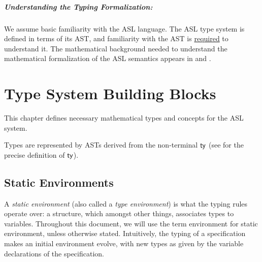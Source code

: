 \documentclass{book}
\begin{document}
\paragraph{Understanding the Typing Formalization:}
We assume basic familiarity with the ASL language.
The ASL type system is defined in terms of its AST,
and familiarity with the AST is \underline{required} to understand it.
The mathematical background needed to understand the mathematical formalization
of the ASL semantics appears in  and .



\chapter{Type System Building Blocks}
\label{chap:typesystembuildingblocks}
This chapter defines necessary mathematical types and concepts for the ASL system.

Types are represented by ASTs derived from the non-terminal $\textsf{ty}$ (see \cite{ASLAbstractSyntaxReference}
for the precise definition of $\textsf{ty}$).

\section{Static Environments}

A \emph{static environment} (also called a \emph{type environment}) is what the typing rules operate over:
a structure, which amongst other things, associates types to variables.
Throughout this document, we will use the term environment for static environment, unless otherwise stated.
Intuitively, the typing of a
specification makes an initial environment evolve, with new types as given by the
variable declarations of the specification.
\end{document}
